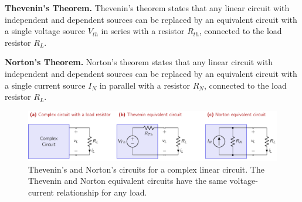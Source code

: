 \noindent\textbf{Thevenin's Theorem.} Thevenin's theorem states that any linear circuit with independent and dependent sources can be replaced by an equivalent circuit with a single voltage source $V_{th}$ in series with a resistor $R_{th}$, connected to the load resistor $R_L$. 

\noindent\textbf{Norton's Theorem.} Norton's theorem states that any linear circuit with independent and dependent sources can be replaced by an equivalent circuit with a single current source $I_{N}$ in parallel with a resistor $R_{N}$, connected to the load resistor $R_L$.
\begin{figure}[t]
    \centering
    \includegraphics[width=\textwidth]{figure/ch02/fig02-05.pdf}
    \caption{Thevenin's and Norton's circuits for a complex linear circuit. The Thevenin and Norton equivalent circuits have the same voltage-current relationship for any load.}
    \label{fig:02-05}
\end{figure}

